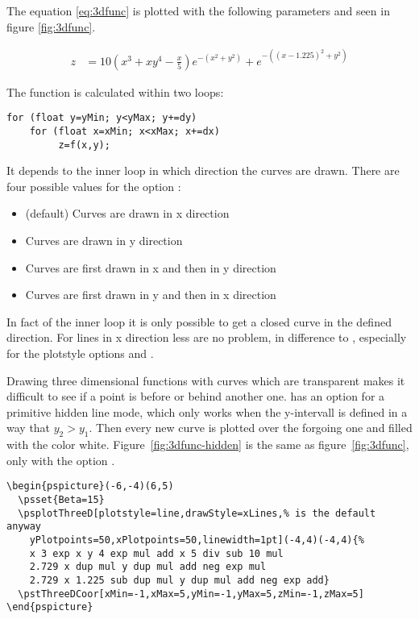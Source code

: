 \documentclass[11pt,english,BCOR10mm,DIV12,bibliography=totoc,parskip=false,smallheadings
    headexclude,footexclude,oneside,dvipsnames,svgnames]{pst-doc}
\begin{document}
The equation \ref{eq:3dfunc} is plotted with the following parameters and seen in figure \ref{fig:3dfunc}.

\begin{align}\label{eq:3dfunc}
z&=10\left(x^3+xy^4-\frac{x}{5}\right)e^{-\left(x^2+y^2\right)}+
	e^{-\left((x-1.225)^2+y^2\right)}
\end{align}


The function is calculated within two loops:
{\small\begin{verbatim}
for (float y=yMin; y<yMax; y+=dy)
    for (float x=xMin; x<xMax; x+=dx)
         z=f(x,y);
\end{verbatim}}

It depends to the inner loop in which direction the curves are drawn. There are four possible
values for the option :
\begin{itemize}
\item {} (default) Curves are drawn in x direction
\item {} Curves are drawn in y direction
\item {} Curves are first drawn in x and then in y direction
\item {} Curves are first drawn in y and then in x direction
\end{itemize}

In fact of the inner loop it is only possible to get a closed curve in the defined direction. 
For lines in x direction less  are no problem, in difference to 
, especially for the plotstyle options  and .

Drawing three dimensional functions with curves which are transparent makes it difficult 
to see if a point is before or behind another one.  has an option 
 for a primitive hidden line mode, which only works when the y-intervall 
is defined in a way that $y_2>y_1$. Then every new curve is plotted over the forgoing one 
and filled with the color white. Figure~\ref{fig:3dfunc-hidden} is the same as 
figure~\ref{fig:3dfunc}, only with the option .

\begin{lstlisting}
\begin{pspicture}(-6,-4)(6,5)
  \psset{Beta=15}
  \psplotThreeD[plotstyle=line,drawStyle=xLines,% is the default anyway
    yPlotpoints=50,xPlotpoints=50,linewidth=1pt](-4,4)(-4,4){%
    x 3 exp x y 4 exp mul add x 5 div sub 10 mul
    2.729 x dup mul y dup mul add neg exp mul
    2.729 x 1.225 sub dup mul y dup mul add neg exp add}
  \pstThreeDCoor[xMin=-1,xMax=5,yMin=-1,yMax=5,zMin=-1,zMax=5]
\end{pspicture}
\end{lstlisting}
\end{document}

